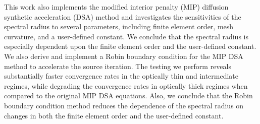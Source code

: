 \documentclass[12pt]{article}
\begin{document}
This work also implements the modified interior penalty (MIP) diffusion synthetic acceleration (DSA) method and investigates the sensitivities of the spectral radius to several parameters, including finite element order, mesh curvature, and a user-defined constant. We conclude that the spectral radius is especially dependent upon the finite element order and the user-defined constant. We also derive and implement a Robin boundary condition for the MIP DSA method to accelerate the source iteration. The testing we perform reveals substantially faster convergence rates in the optically thin and intermediate regimes, while degrading the convergence rates in optically thick regimes when compared to the original MIP DSA equations. Also, we conclude that the Robin boundary condition method reduces the dependence of the spectral radius on changes in both the finite element order and the user-defined constant.
\end{document}

